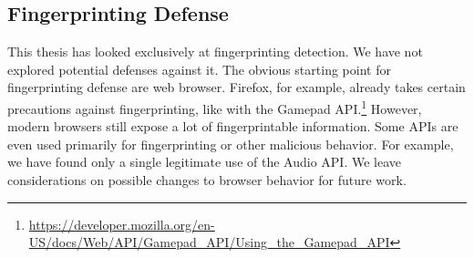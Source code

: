 \documentclass[
    fontsize=12pt,
    headings=small,
    parskip=half,
    bibliography=totoc,
    numbers=noenddot,
    open=any
    ]{scrreprt}
\begin{document}
\subsection{Fingerprinting Defense}
This thesis has looked exclusively at fingerprinting detection. We have not explored
potential defenses against it. The obvious starting point for fingerprinting defense
are web browser. Firefox, for example, already takes certain precautions against fingerprinting,
like with the Gamepad API.\footnote{\url{https://developer.mozilla.org/en-US/docs/Web/API/Gamepad\_API/Using\_the\_Gamepad\_API}}
However, modern browsers still expose a lot of fingerprintable information.
Some APIs are even used primarily for fingerprinting or other malicious behavior.
For example, we have found only a single legitimate use of the Audio API.
We leave considerations on possible changes to browser behavior for future work.





\end{document}
